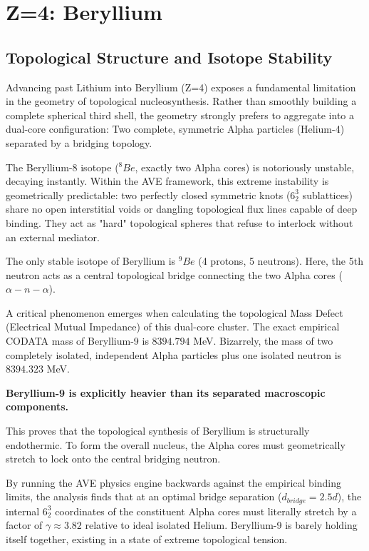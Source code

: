 \chapter{Z=4: Beryllium}
\label{ch:beryllium}

\section{Topological Structure and Isotope Stability}
Advancing past Lithium into Beryllium (Z=4) exposes a fundamental limitation in the geometry of topological nucleosynthesis. Rather than smoothly building a complete spherical third shell, the geometry strongly prefers to aggregate into a dual-core configuration: Two complete, symmetric Alpha particles (Helium-4) separated by a bridging topology.

The Beryllium-8 isotope ($^8Be$, exactly two Alpha cores) is notoriously unstable, decaying instantly. Within the AVE framework, this extreme instability is geometrically predictable: two perfectly closed symmetric knots ($6^3_2$ sublattices) share no open interstitial voids or dangling topological flux lines capable of deep binding. They act as "hard" topological spheres that refuse to interlock without an external mediator.

The only stable isotope of Beryllium is $^9Be$ (4 protons, 5 neutrons). Here, the 5th neutron acts as a central topological bridge connecting the two Alpha cores ($\alpha - n - \alpha$). 

A critical phenomenon emerges when calculating the topological Mass Defect (Electrical Mutual Impedance) of this dual-core cluster. The exact empirical CODATA mass of Beryllium-9 is $8394.794$ MeV. Bizarrely, the mass of two completely isolated, independent Alpha particles plus one isolated neutron is $8394.323$ MeV. 

\textbf{Beryllium-9 is explicitly heavier than its separated macroscopic components.}

This proves that the topological synthesis of Beryllium is structurally endothermic. To form the overall nucleus, the Alpha cores must geometrically stretch to lock onto the central bridging neutron. 

By running the AVE physics engine backwards against the empirical binding limits, the analysis finds that at an optimal bridge separation ($d_{bridge} = 2.5d$), the internal $6^3_2$ coordinates of the constituent Alpha cores must literally stretch by a factor of $\gamma \approx 3.82$ relative to ideal isolated Helium. Beryllium-9 is barely holding itself together, existing in a state of extreme topological tension.


